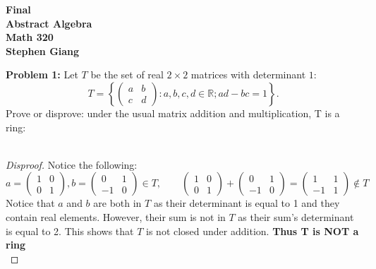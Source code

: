 \documentclass[12pt]{article}
\begin{document}
	
	\begin{center}
		\textbf{Final} \\
		\textbf{Abstract Algebra} \\
		\textbf{Math 320} \\
		\textbf{Stephen Giang} \\
	\end{center}

\noindent \textbf{Problem 1: }Let $T$ be the set of real $2 \times 2$ matrices with determinant $1$:
	$$
	T = \left\{ 
	\begin{pmatrix}
		a & b \\
		c & d
	\end{pmatrix}: a,b,c,d \in \mathbb{R}; ad-bc = 1 \right\}.
	$$
Prove or disprove: under the usual matrix addition and multiplication, T is a ring:
\\ \\
\begin{proof}[Disproof]
	Notice the following:
		$$
		a = \begin{pmatrix}
			1 & 0 \\ 0 & 1
		\end{pmatrix},
		b = \begin{pmatrix}
			0 & 1 \\ -1 & 0
		\end{pmatrix} \in T, \qquad
		\begin{pmatrix}
		1 & 0 \\ 0 & 1
		\end{pmatrix} + 
		\begin{pmatrix}
		0 & 1 \\ -1 & 0
		\end{pmatrix} = 
		\begin{pmatrix}
		1 & 1 \\ -1 & 1
		\end{pmatrix} \not \in T
		$$
	Notice that $a$ and $b$ are both in $T$ as their determinant is equal to 1 and they contain real elements.  However, their sum is not in $T$ as their sum's determinant is equal to 2.  This shows that $T$ is not closed under addition. \textbf{Thus T is NOT a ring}\\
\end{proof}
\newpage
\end{document}
